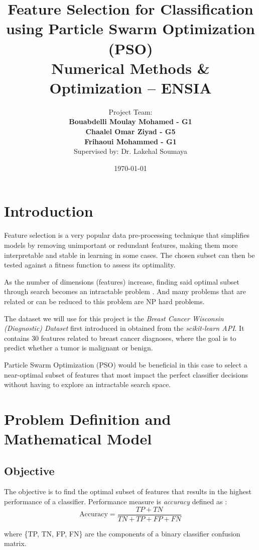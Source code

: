 \documentclass[12pt]{article}
\title{
    \vspace{1cm}
    \Huge{\textbf{Feature Selection for Classification using Particle Swarm Optimization (PSO)}}\\
    \vspace{0.5cm}
    \Large{Numerical Methods \& Optimization – ENSIA}
}
\author{
    \large{Project Team:} \\
    \textbf{Bouabdelli Moulay Mohamed - G1} \\
    \textbf{Chaalel Omar Ziyad - G5} \\
    \textbf{Frihaoui Mohammed - G1} \\
    \vspace{0.3cm}
    \normalsize{Supervised by: Dr. Lakehal Soumaya}
}
\date{\today}
\begin{document}
\maketitle
\thispagestyle{empty}
\newpage

\tableofcontents
\newpage

\section{Introduction}

Feature selection is a very popular data pre-processing technique that simplifies models by removing unimportant or redundant features, making them more interpretable and stable in learning in some cases. The chosen subset can then be tested against a fitness function to assess its optimality.

As the number of dimensions (features) increase, finding said optimal subset through search becomes an intractable problem \cite{kohavi1997wrappers}. And many problems that are related or can be reduced to this problem are NP hard problems\cite{blum1992npcomplete}.

The dataset we will use for this project is the \textit{Breast Cancer Wisconsin (Diagnostic) Dataset} first introduced in \cite{Street1993NuclearFE} obtained from the \textit{scikit-learn API}. It contains 30 features related to breast cancer diagnoses, where the goal is to predict whether a tumor is malignant or benign.

Particle Swarm Optimization (PSO) would be beneficial in this case to select a near-optimal subset of features that most impact the perfect classifier decisions without having to explore an intractable search space.

\section{Problem Definition and Mathematical Model}
\subsection{Objective}
The objective is to find the optimal subset of features that results in the highest performance of a classifier. Performance measure is \textit{ accuracy} defined as :
$$ \text{Accuracy} = \frac{TP + TN}{TN + TP + FP + FN} $$

where \{TP, TN, FP, FN\} are the components of a binary classifier confusion matrix.
\end{document}
